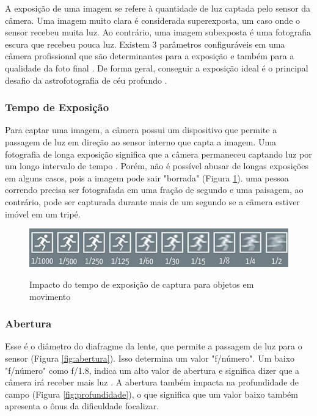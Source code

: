 A exposição de uma imagem se refere à quantidade de luz captada pelo sensor da câmera. Uma imagem muito clara é considerada superexposta, um caso onde o sensor recebeu muita luz. Ao contrário, uma imagem subexposta é uma fotografia escura que recebeu pouca luz. Existem 3 parâmetros configuráveis em uma câmera profissional que são determinantes para a exposição e também para a qualidade da foto final \cite{site:eduardoemonica}. De forma geral, conseguir a exposição ideal é o principal desafio da astrofotografia de céu profundo \cite{livro:astropratica}.


\subsubsection{Tempo de Exposição}

Para captar uma imagem, a câmera possui um dispositivo que permite a passagem de luz em direção ao sensor interno que capta a imagem. Uma fotografia de longa exposição significa que a câmera permaneceu captando luz por um longo intervalo de tempo \cite{book:bbcsky}. Porém, não é possível abusar de longas exposições em alguns casos, pois a imagem pode sair "borrada" (Figura \ref{fig:velocidade}). uma pessoa correndo precisa ser fotografada em uma fração de segundo e uma paisagem, ao contrário, pode ser capturada durante mais de um segundo se a câmera estiver imóvel em um tripé.  

\begin{figure}[!htb]
	\centering
	\caption{Impacto do tempo de exposição de captura para objetos em movimento}
	\includegraphics[width=0.7\linewidth]{figuras/velocidade}
	\label{fig:velocidade}
\end{figure}

\subsubsection{Abertura}

Esse é o diâmetro do diafragme da lente, que permite a passagem de luz para o sensor (Figura \ref{fig:abertura}). Isso determina um valor "f/número". Um baixo "f/número" como f/1.8, indica um alto valor de abertura e significa dizer que a câmera irá receber mais luz \cite{book:bbcsky}. A abertura também impacta na profundidade de campo (Figura \ref{fig:profundidade}), o que significa que um valor baixo também apresenta o ônus da dificuldade focalizar.

